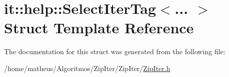 \hypertarget{structit_1_1help_1_1SelectIterTag}{}\section{it\+:\+:help\+:\+:Select\+Iter\+Tag$<$... $>$ Struct Template Reference}
\label{structit_1_1help_1_1SelectIterTag}


The documentation for this struct was generated from the following file\+:\begin{DoxyCompactItemize}
\item 
/home/matheus/\+Algoritmos/\+Zip\+Iter/\+Zip\+Iter/\hyperlink{ZipIter_8h}{Zip\+Iter.\+h}\end{DoxyCompactItemize}
